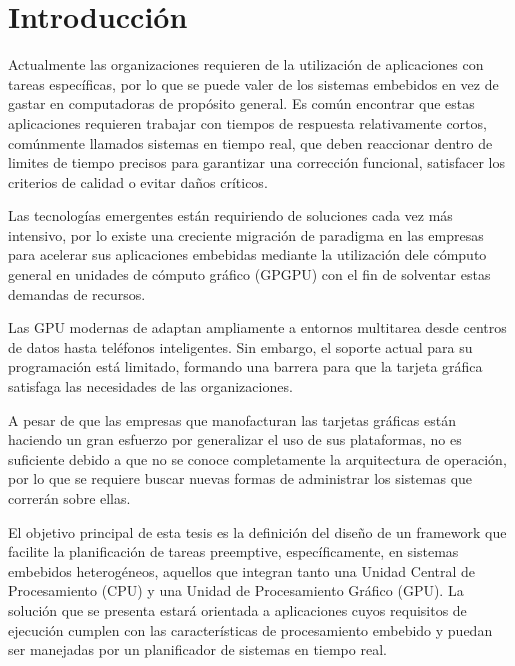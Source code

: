 

\chapter{Introducción}
\label{cha:Introducción}

\graphicspath{{figures/}}


Actualmente las organizaciones requieren de la utilización de aplicaciones con tareas específicas, por lo que se puede valer de los sistemas embebidos en vez de gastar en computadoras de propósito general. Es común encontrar que estas aplicaciones requieren trabajar con tiempos de respuesta relativamente cortos, comúnmente llamados sistemas en tiempo real, que deben reaccionar dentro de limites de tiempo precisos para garantizar una corrección funcional, satisfacer los criterios de calidad o evitar daños críticos.
\newline

Las tecnologías emergentes están requiriendo de soluciones cada vez más intensivo, por lo existe una creciente migración de paradigma en las empresas para acelerar sus aplicaciones embebidas mediante la utilización dele cómputo general en unidades de cómputo gráfico (GPGPU) con el fin de solventar estas demandas de recursos.
\newline

Las GPU modernas de adaptan ampliamente a entornos multitarea desde centros de datos hasta teléfonos inteligentes. Sin embargo, el soporte actual para su programación está limitado, formando una barrera para que la tarjeta gráfica satisfaga las necesidades de las organizaciones.
\newline

A pesar de que las empresas que manofacturan las tarjetas gráficas están haciendo un gran esfuerzo por generalizar el uso de sus plataformas, no es suficiente debido a que no se conoce completamente la arquitectura de operación, por lo que se requiere buscar nuevas formas de administrar los sistemas que correrán sobre ellas.
\newline

El objetivo principal de esta tesis es la definición del diseño de un framework que facilite la planificación de tareas preemptive, específicamente, en sistemas embebidos heterogéneos, aquellos que integran tanto una Unidad Central de Procesamiento (CPU) y una Unidad de Procesamiento Gráfico (GPU). La solución que se presenta estará orientada a aplicaciones cuyos requisitos de ejecución cumplen con las características de procesamiento embebido y puedan ser manejadas por un planificador de sistemas en tiempo real.
\newline

